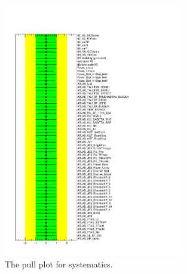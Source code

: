 \begin{figure}[htbp]
\centering
\includegraphics[width=0.7\textwidth, keepaspectratio]{fig/OneLepTwoTaus/NuisPar.pdf}
\caption{The pull plot for systematics.}
\label{Fig:1l2tau.nuispar}
\end{figure}

